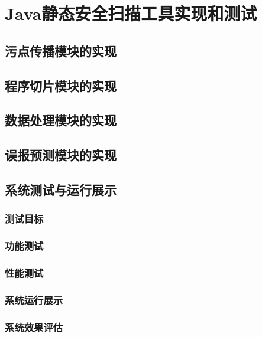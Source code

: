 \chapter{Java静态安全扫描工具实现和测试}
\section{污点传播模块的实现}

\section{程序切片模块的实现}

\section{数据处理模块的实现}

\section{误报预测模块的实现}

\section{系统测试与运行展示}
\subsection{测试目标}
\subsection{功能测试}
\subsection{性能测试}
\subsection{系统运行展示}
\subsection{系统效果评估}